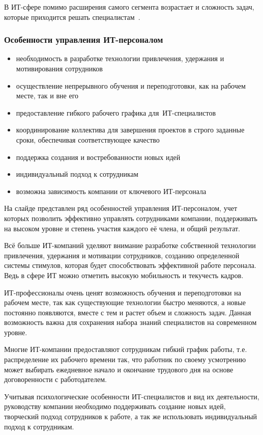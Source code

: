 \documentclass{../industrial-development}
\begin{document}
В ИТ-сфере помимо расширения самого сегмента возрастает и сложность задач, которые приходится решать специалистам~\cite{Bogatova}.

\begin{frame} \frametitle{Особенности управления ИТ-персоналом}
  \begin{itemize}
	\item необходимость в разработке технологии привлечения, удержания и мотивирования сотрудников
	\item осуществление непрерывного обучения и переподготовки, как на рабочем месте, так и вне его
	\item предоставление гибкого рабочего графика для~ИТ-специалистов
	\item координирование коллектива для завершения проектов в строго заданные сроки, обеспечивая соответствующее качество
	\item поддержка создания и востребованности новых идей
	\item индивидуальный подход к сотрудникам
	\item возможна зависимость компании от ключевого ИТ-персонала
    \end{itemize}

\end{frame}
\lecturenotes

На слайде представлен ряд особенностей управления ИТ-персоналом, учет которых позволить эффективно управлять сотрудниками компании, поддерживать на высоком уровне и степень участия каждого её члена, и общий результат.

Всё больше ИТ-компаний уделяют внимание разработке собственной технологии привлечения, удержания и мотивации сотрудников, созданию определенной системы стимулов, которая будет способствовать эффективной работе персонала. Ведь в сфере ИТ можно отметить высокую мобильность и текучесть кадров.

ИТ-профессионалы очень ценят возможность обучения и переподготовки на рабочем месте, так как существующие технологии быстро меняются, а новые постоянно появляются, вместе с тем и растет объем и сложность задач. Данная возможность важна для сохранения набора знаний специалистов на современном уровне. 

Многие ИТ-компании предоставляют сотрудникам гибкий график работы, т.е. распределение их рабочего времени так, что работник по своему усмотрению может выбирать ежедневное начало и окончание трудового дня на основе договоренности с работодателем.

Учитывая психологические особенности ИТ-специалистов и вид их деятельности, руководству компании необходимо поддерживать создание новых идей, творческий подход сотрудников к работе, а так же использовать индивидуальный подход к сотрудникам.
\end{document}
